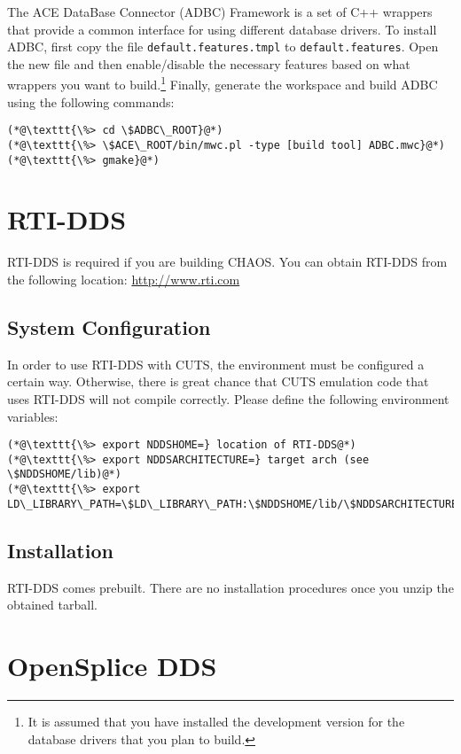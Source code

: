 The ACE DataBase Connector (ADBC) Framework is a set of C++ wrappers 
that provide a common interface for using different database drivers.
To install ADBC, first copy the file \texttt{default.features.tmpl} to
\texttt{default.features}. Open the new file and then enable/disable
the necessary features based on what wrappers you want to 
build.\footnote{It is assumed that you have installed the development
version for the database drivers that you plan to build.} Finally,
generate the workspace and build ADBC using the following commands:
\begin{lstlisting}
(*@\texttt{\%> cd \$ADBC\_ROOT}@*)
(*@\texttt{\%> \$ACE\_ROOT/bin/mwc.pl -type [build tool] ADBC.mwc}@*)
(*@\texttt{\%> gmake}@*)
\end{lstlisting}
 
\section{RTI-DDS}
\label{sec:thirdparty-rtidds}

RTI-DDS is required if you are building CHAOS. You can obtain RTI-DDS
from the following location: \url{http://www.rti.com}

\subsection{System Configuration}
In order to use RTI-DDS with CUTS, the environment must be configured 
a certain way. Otherwise, there is great chance that CUTS emulation 
code that uses RTI-DDS will not compile correctly. Please define the 
following environment variables:
\begin{lstlisting}
(*@\texttt{\%> export NDDSHOME=} location of RTI-DDS@*)
(*@\texttt{\%> export NDDSARCHITECTURE=} target arch (see \$NDDSHOME/lib)@*)
(*@\texttt{\%> export LD\_LIBRARY\_PATH=\$LD\_LIBRARY\_PATH:\$NDDSHOME/lib/\$NDDSARCHITECTURE}@*)
\end{lstlisting}

\subsection{Installation}

RTI-DDS comes prebuilt. There are no installation procedures 
once you unzip the obtained tarball.

\section{OpenSplice DDS}
\label{sec:thirdparty-ospl}

